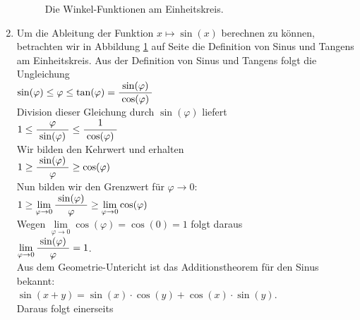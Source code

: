 \begin{enumerate}
      \begin{figure}[!h]
        \centering
        \caption{Die Winkel-Funktionen am Einheitskreis.}
        \label{fig:circle}
      \end{figure}
\item Um die Ableitung der Funktion $x \mapsto \sin(x)$ berechnen zu k\"onnen, 
      betrachten wir in Abbildung \ref{fig:circle} auf Seite \pageref{fig:circle} die Definition von
      Sinus und Tangens am Einheitskreis.  Aus der Definition von Sinus und Tangens folgt die Ungleichung 
      \\[0.3cm]
      \hspace*{1.3cm}
      $\sin(\varphi) \leq \varphi \leq \tan(\varphi) = \displaystyle\frac{\;\displaystyle\sin(\varphi)\;}{\;\displaystyle\cos(\varphi)\;}$
      \\[0.3cm]
      Division dieser Gleichung durch $\sin(\varphi)$ liefert
      \\[0.3cm]
      \hspace*{1.3cm}
      $1 \leq \displaystyle\frac{\;\displaystyle\varphi\;}{\;\displaystyle\sin(\varphi)\;} \leq \displaystyle\frac{\;\displaystyle1\;}{\;\displaystyle\cos(\varphi)\;}$
      \\[0.3cm]
      Wir bilden den Kehrwert und erhalten
      \\[0.3cm]
      \hspace*{1.3cm}
      $1 \geq \displaystyle\frac{\;\displaystyle\sin(\varphi)\;}{\;\displaystyle\varphi\;} \geq \cos(\varphi)$
      \\[0.3cm]
      Nun bilden wir den Grenzwert f\"ur $\varphi \rightarrow 0$:
      \\[0.3cm]
      \hspace*{1.3cm}
      $1 \geq \lim\limits_{\varphi \rightarrow 0} \displaystyle\frac{\;\displaystyle\sin(\varphi)\;}{\;\displaystyle\varphi\;} \geq \lim\limits_{\varphi \rightarrow 0}\cos(\varphi)$
      \\[0.3cm]
      Wegen $\lim\limits_{\varphi \rightarrow 0} \cos(\varphi) = \cos(0) = 1$ folgt daraus
      \\[0.1cm]
      \hspace*{1.3cm}
      $\lim\limits_{\varphi \rightarrow 0} \displaystyle\frac{\;\displaystyle\sin(\varphi)\;}{\;\displaystyle\varphi\;} = 1$.
      \\[0.3cm]
       Aus dem Geometrie-Untericht ist das Additionstheorem f\"ur den Sinus 
       bekannt: 
       \\[0.3cm]
       \hspace*{1.3cm} $\sin(x+y) = \sin(x) \cdot \cos(y) + \cos(x) \cdot \sin(y)$.
         \\[0.2cm]
       Daraus folgt einerseits
       \\[0.3cm]

\end{enumerate}
